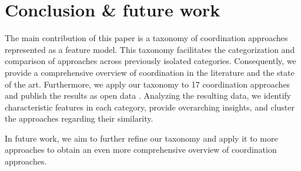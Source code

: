 \documentclass[runningheads]{llncs}
\begin{document}
\section{Conclusion \& future work} \label{sec: conclusion}

The main contribution of this paper is a taxonomy of coordination approaches represented as a feature model.
This taxonomy facilitates the categorization and comparison of approaches across previously isolated categories.
Consequently, we provide a comprehensive overview of coordination in the literature and the state of the art.
Furthermore, we apply our taxonomy to 17 coordination approaches and publish the results as open data \cite{timkrauterArtifactsCoordination2024}.
Analyzing the resulting data, we identify characteristic features in each category, provide overarching insights, and cluster the approaches regarding their similarity. 

In future work, we aim to further refine our taxonomy and apply it to more approaches to obtain an even more comprehensive overview of coordination approaches.



\end{document}
